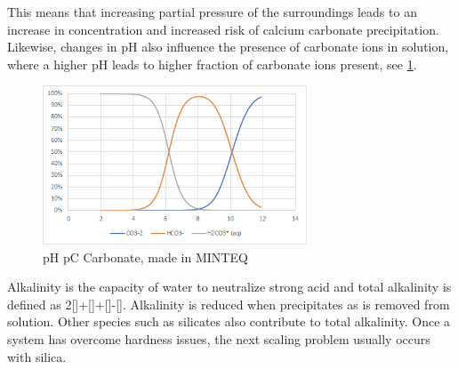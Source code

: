 This means that increasing partial pressure of  the surroundings leads to an increase in  concentration and increased risk of calcium carbonate precipitation. 
Likewise, changes in pH also influence the presence of carbonate ions in solution, where a higher pH leads to higher fraction of carbonate ions present, see \cref{fig:pH_pC}. 


\begin{figure}[H]
    \centering
    \includegraphics[width=0.7\textwidth]{Billeder/teori/pH_pC_Carbonat.png}
    \caption{pH pC Carbonate, made in MINTEQ}
    \label{fig:pH_pC}
\end{figure}


Alkalinity is the capacity of water to neutralize strong acid and total alkalinity is defined as 2[]+[]+[]-[].  \citep{WaterChemistry1980}
Alkalinity is reduced when  precipitates as  is removed from solution. \citep{WaterChemistry1980}
Other species such as silicates also contribute to total alkalinity. \citep{WaterChemistry1980} 
Once a system has overcome hardness issues, the next scaling problem usually occurs with silica. \citep{ChemistrySilicaScale2014}





